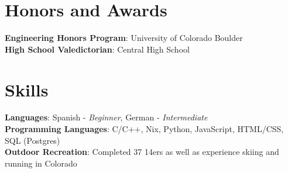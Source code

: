 \documentclass[letterpaper,11pt]{article}
\begin{document}
 \section{Honors and Awards}
 \begin{itemize}[leftmargin=0.15in, label={}]
    \small{\item{
     \textbf{Engineering Honors Program}{: University of Colorado Boulder}\\
     \textbf{High School Valedictorian}{: Central High School}
     \textbf{}
    }}
 \end{itemize}
 
\section{Skills}
 \begin{itemize}[leftmargin=0.15in, label={}]
    \small{\item{
     \textbf{Languages}{: Spanish - \textit{Beginner}, German - \textit{Intermediate}} \\
     \textbf{Programming Languages}{: C/C++, Nix, Python, JavaScript, HTML/CSS, SQL (Postgres)} \\
     \textbf{Outdoor Recreation}{: Completed 37 14ers as well as experience skiing and running in Colorado}
    }}
 \end{itemize}
 
\end{document}
